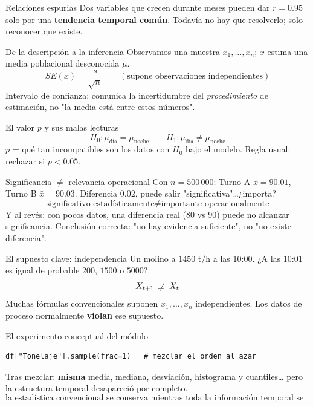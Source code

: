 \begin{frame}{Relaciones espurias}
Dos variables que crecen durante meses pueden dar $r=0.95$ solo por una
\textbf{tendencia temporal común}.
\vfill
{}
\vfill
Todavía no hay que resolverlo; solo reconocer que existe.
\end{frame}

\begin{frame}{De la descripción a la inferencia}
Observamos una muestra $x_1,\dots,x_n$; $\bar{x}$ estima una media poblacional
desconocida $\mu$.
\[
SE(\bar{x})=\frac{s}{\sqrt{n}}
\qquad(\text{supone observaciones independientes})
\]
Intervalo de confianza: comunica la incertidumbre del \emph{procedimiento} de estimación,
no "la media está entre estos números".
\end{frame}

\begin{frame}{El valor $p$ y sus malas lecturas}
\[
H_0:\mu_{\text{día}}=\mu_{\text{noche}}
\qquad
H_1:\mu_{\text{día}}\neq\mu_{\text{noche}}
\]
$p$ = qué tan incompatibles son los datos con $H_0$ bajo el modelo. Regla usual:
rechazar si $p<0.05$.
\vfill
{}
\end{frame}

\begin{frame}{Significancia $\neq$ relevancia operacional}
Con $n=500\,000$: Turno A $\bar{x}=90.01$, Turno B $\bar{x}=90.03$.
Diferencia $0.02$, puede salir "significativa"\ldots ¿importa?
\vfill
\[
\boxed{\text{significativo estadísticamente}\neq\text{importante operacionalmente}}
\]
Y al revés: con pocos datos, una diferencia real ($80$ vs $90$) puede no alcanzar significancia.
Conclusión correcta: "no hay evidencia suficiente", no "no existe diferencia".
\end{frame}

\begin{frame}{El supuesto clave: independencia}
Un molino a $1450$ t/h a las 10:00. ¿A las 10:01 es igual de probable $200$, $1500$ o $5000$?
\vfill
\[
X_{t+1}\ \not\!\perp\ X_t
\]
Muchas fórmulas convencionales suponen $x_1,\dots,x_n$ independientes. Los datos de
proceso normalmente \textbf{violan} ese supuesto.
\end{frame}

\begin{frame}[fragile]{El experimento conceptual del módulo}
\begin{lstlisting}
df["Tonelaje"].sample(frac=1)   # mezclar el orden al azar
\end{lstlisting}
Tras mezclar: \textbf{misma} media, mediana, desviación, histograma y cuantiles\ldots
pero la estructura temporal desapareció por completo.
\vfill
\[
\boxed{\text{la estadística convencional se conserva mientras toda la información temporal se pierde}}
\]
\end{frame}

